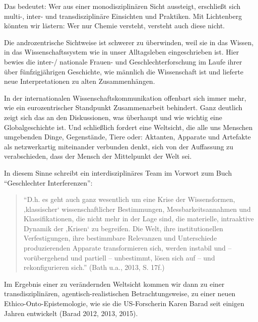 Das bedeutet: Wer aus einer monodisziplinären Sicht aussteigt,
erschließt sich multi-, inter- und transdisziplinäre Einsichten und
Praktiken. Mit Lichtenberg könnten wir lästern: Wer nur Chemie versteht,
versteht auch diese nicht.

Die androzentrische Sichtweise ist schwerer zu überwinden, weil sie in
das Wissen, in das Wissenschaftssystem wie in unser Alltagsleben
eingeschrieben ist. Hier bewies die inter-/ nationale Frauen- und
Geschlechterforschung im Laufe ihrer über fünfzigjährigen Geschichte,
wie männlich die Wissenschaft ist und lieferte neue Interpretationen zu
alten Zusammenhängen.

In der internationalen Wissenschaftskommunikation offenbart sich immer
mehr, wie ein eurozentrischer Standpunkt Zusammenarbeit behindert. Ganz
deutlich zeigt sich das an den Diskussionen, was überhaupt und wie
wichtig eine Globalgeschichte ist. Und schließlich fordert eine
Weltsicht, die alle uns Menschen umgebenden Dinge, Gegenstände, Tiere
oder: Aktanten, Apparate und Artefakte als netzwerkartig miteinander
verbunden denkt, sich von der Auffassung zu verabschieden, dass der
Mensch der Mittelpunkt der Welt sei.

In diesem Sinne schreibt ein interdisziplinäres Team im Vorwort zum Buch
\enquote{Geschlechter Interferenzen}:

\begin{quote}
\enquote{D.h. es geht auch ganz wesentlich um eine Krise der
Wissensformen, ‚klassischer` wissenschaftlicher Bestimmungen,
Messbarkeitsannahmen und Klassifikationen, die nicht mehr in der Lage
sind, die materielle, intraaktive Dynamik der ‚Krisen` zu begreifen. Die
Welt, ihre institutionellen Verfestigungen, ihre bestimmbare Relevanzen
und Unterschiede produzierenden Apparate transformieren sich, werden
instabil und -- vorübergehend und partiell -- unbestimmt, lösen sich auf
-- und rekonfigurieren sich.} (Bath u.a., 2013, S. 17f.)
\end{quote}

Im Ergebnis einer zu verändernden Weltsicht kommen wir dann zu einer
transdisziplinären, agentisch-realistischen Betrachtungsweise, zu einer
neuen Ethico-Onto-Epistemologie, wie sie die US-Forscherin Karen Barad
seit einigen Jahren entwickelt (Barad 2012, 2013, 2015).

